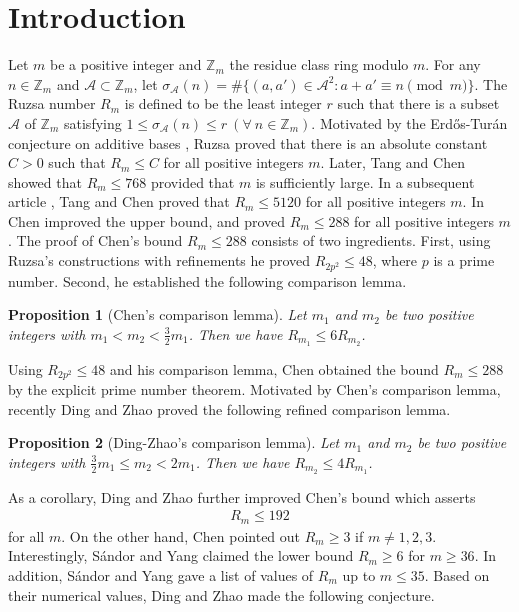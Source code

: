 \documentclass[12pt,a4paper,reqno]{amsart}
\numberwithin{equation}{section}
\theoremstyle{plain}
\newtheorem{proposition}{Proposition}
\theoremstyle{definition}
\begin{document}
 
\section{Introduction}
Let $m$ be a positive integer and $\mathbb{Z}_m$ the residue class ring modulo $m$. For any 
$n\in \mathbb{Z}_m$ and $\mathcal{A}\subset \mathbb{Z}_m$, let
$
\sigma_{\mathcal{A}}(n)
=\#\big\{(a,a')\in\mathcal A^2:
 a+a'\equiv n\pmod{m}\big\}.
$
The Ruzsa number $R_m$ is defined to be the least integer $r$ such that there is a subset $\mathcal{A}$ of 
$\mathbb{Z}_m$ satisfying 
$
1\le \sigma_{\mathcal{A}}(n)\le r ~ (\forall~n\in \mathbb{Z}_m).
$
Motivated by the Erd\H os-Tur\'an conjecture on additive bases \cite{ET41}, Ruzsa \cite{Ru90} proved that there is an absolute constant $C>0$ such that $R_m\le C$ for all positive integers $m$. Later, Tang and Chen \cite{TC06} showed that $R_m\le 768$ provided that $m$ is sufficiently large. In a subsequent article \cite{TC07}, Tang and Chen proved that $R_m\le 5120$ for all positive integers $m$. In \cite{Ch08} Chen improved the upper bound, and proved $R_m\le 288$ for all positive integers $m$.
The proof of Chen's bound $R_m\le 288$ consists of two ingredients. First, using Ruzsa's constructions with refinements he proved $R_{2p^2}\le 48$, where $p$ is a prime number. Second, he established the following comparison lemma.

\begin{proposition}[Chen's comparison lemma]\label{prop:1}
Let $m_1$ and $m_2$ be two positive integers with $m_1<m_2<\frac{3}{2}m_1$. Then we have $R_{m_1}\le 6R_{m_2}$.
\end{proposition}

Using $R_{2p^2}\le 48$ and his comparison lemma, Chen obtained the bound $R_m\le 288$ by the explicit prime number theorem. Motivated by Chen's comparison lemma, recently Ding and Zhao \cite{DZ24} proved the following refined comparison lemma.
\begin{proposition}[Ding-Zhao's comparison lemma]\label{prop:2}
Let $m_1$ and $m_2$ be two positive integers with $\frac{3}{2}m_1\le m_2<2m_1$. Then we have $R_{m_2}\le 4R_{m_1}$.
\end{proposition}

As a corollary, Ding and Zhao \cite{DZ24} further improved Chen's bound which asserts 
\begin{align}\label{eq-intro-1}
   R_m\le 192 
\end{align}
for all $m$. On the other hand, Chen \cite{Ch08} pointed out $R_m\ge 3$ if $m\neq 1,2,3$. Interestingly, S\'andor and Yang \cite{SY17} claimed the lower bound  $R_m\ge 6$ for $m\ge 36$. In addition, S\'andor and Yang gave a list of values of $R_m$ up to $m\le 35$.  Based on their numerical values, Ding and Zhao \cite{DZ24} made the following conjecture.
\end{document}
